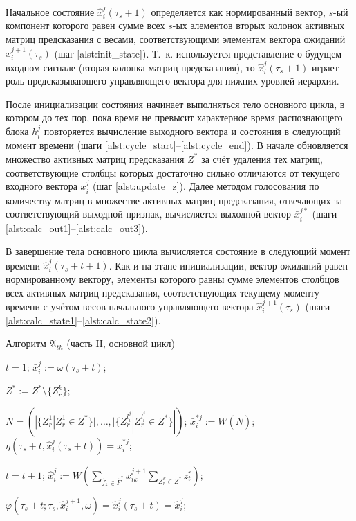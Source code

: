 \documentclass[a4paper, 12pt]{article}
\theoremstyle{plain}
\begin{document}
	Начальное состояние $\hat x_i^j(\tau_s+1)$ определяется как нормированный вектор, $s$-ый компонент которого равен сумме всех $s$-ых элементов вторых колонок активных матриц предсказания с весами, соответствующими элементам вектора ожиданий $\hat x_i^{j+1}(\tau_s)$ (шаг \ref{alst:init_state}). Т.~к. используется представление о будущем входном сигнале (вторая колонка матриц предсказания), то $\hat x_i^j(\tau_s+1)$ играет роль предсказывающего управляющего вектора для нижних уровней иерархии.
	
	После инициализации состояния начинает выполняться тело основного цикла, в котором до тех пор, пока время не превысит характерное время распознающего блока $h_i^j$ повторяется вычисление выходного вектора и состояния в следующий момент времени (шаги \ref{alst:cycle_start}--\ref{alst:cycle_end}). В начале обновляется множество активных матриц предсказания $Z^*$ за счёт удаления тех матриц, соответствующие столбцы которых достаточно сильно отличаются от текущего входного вектора $\bar x_i^j$ (шаг \ref{alst:update_z}). Далее методом голосования по количеству матриц в множестве активных матриц предсказания, отвечающих за соответствующий выходной признак, вычисляется выходной вектор $\bar x_i^{j*}$ (шаги \ref{alst:calc_out1}--\ref{alst:calc_out3}).
			
	В завершение тела основного цикла вычисляется состояние в следующий момент времени $\hat x_i^j(\tau_s+t+1)$. Как и на этапе инициализации, вектор ожиданий равен нормированному вектору, элементы которого равны сумме элементов столбцов всех активных матриц предсказания, соответствующих текущему моменту времени с учётом весов начального управляющего вектора $\hat x_i^{j+1}(\tau_s)$ (шаги \ref{alst:calc_state1}--\ref{alst:calc_state2}).
	\begin{algorithm}[H]
		\caption{Алгоритм $\mathfrak{A}_{th}$ (часть II, основной цикл)}\label{alg:th_cycle}
		\begin{algorithmic}[1]
			\State $t=1$;
			 \label{alst:cycle_start}
				\State $\bar{x}_i^j:=\omega(\tau_s+t)$;

					 \label{alst:update_z}
						\State $Z^*:=Z^*\setminus\{Z_r^k\}$;
					\EndIf
				\EndFor

				\State $\bar N=(|\{Z_r^1|Z_r^1\in Z^*\}|,\dots,|\{Z_r^{l_i^j}|Z_r^{l_i^j}\in Z^*\}|)$; \label{alst:calc_out1}
				\State $\bar{x}_i^{*j}:=W(\bar N)$; \label{alst:calc_out2}
				\State $\eta(\tau_s+t, \hat{x}_i^j(\tau_s+t))=\bar{x}_i^{*j}$; \label{alst:calc_out3}
							
				\State $t=t+1$;
					\State $\hat{x}_i^j:=W(\sum_{\hat f_k\in\hat F^*}\hat x_{ik}^{j+1}\sum_{Z_r^k\in Z^*}\bar z_t^r)$; \label{alst:calc_state1}
								
					\State $\varphi(\tau_s+t;\tau_s,\hat{x}_i^{j+1}, \omega)=\hat{x}_i^j(\tau_s+t)=\hat{x}_i^j$; \label{alst:calc_state2}
				\EndIf
			\EndWhile \label{alst:cycle_end}
		\end{algorithmic}
	\end{algorithm}
	
\end{document}
